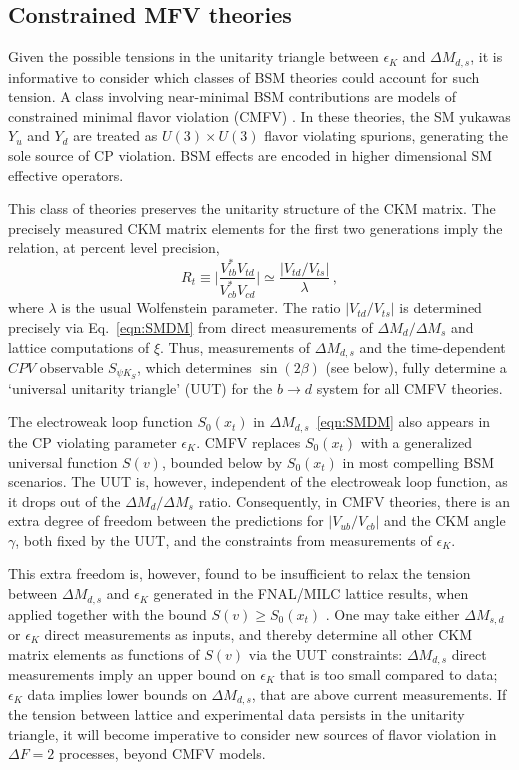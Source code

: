 \subsection{Constrained MFV theories}
Given the possible tensions in the unitarity triangle between $\epsilon_K$ and $\Delta M_{d,s}$, it is informative to consider which classes of BSM theories could account for such tension. A class involving near-minimal BSM contributions are models of constrained minimal flavor violation (CMFV) \cite{Buras:2000dm,Buras:2003jf,Blanke:2006ig,Blanke:2006yh,Blanke:2016bhf}. In these theories, the SM yukawas $Y_u$ and $Y_d$ are treated as $U(3)\times U(3)$ flavor violating spurions, generating the sole source of CP violation.  BSM effects are encoded in higher dimensional SM effective operators.

This class of theories preserves the unitarity structure of the CKM matrix. The precisely measured CKM matrix elements for the first two generations imply the relation, at percent level precision,
\begin{equation}
	R_t \equiv \bigg|\frac{V_{tb}^*V_{td}}{V_{cb}^*V_{cd}}\bigg| \simeq \frac{|V_{td}/V_{ts}|}{\lambda}\,,
\end{equation}
where $\lambda$ is the usual Wolfenstein parameter. The ratio $|V_{td}/V_{ts}|$ is determined precisely via Eq.~\eqref{eqn:SMDM} from direct measurements of $\Delta M_d/ \Delta M_s$ and lattice computations of $\xi$. Thus, measurements of $\Delta M_{d,s}$ and the time-dependent $CPV$ observable $S_{\psi K_S}$, which determines $\sin(2\beta)$ (see below), fully determine a `universal unitarity triangle' (UUT) for the $b \to d$ system for all CMFV theories. 

The electroweak loop function $S_0(x_t)$ in $\Delta M_{d,s}$~\eqref{eqn:SMDM} also appears in the CP violating parameter $\epsilon_K$. CMFV replaces $S_0(x_t)$ with a generalized universal function $S(v)$, bounded below by $S_0(x_t)$ in most compelling BSM scenarios. The UUT is, however, independent of the electroweak loop function, as it drops out of the $\Delta M_{d}/\Delta M_s$ ratio. Consequently, in CMFV theories, there is an extra degree of freedom between the predictions for $|V_{ub}/V_{cb}|$ and the CKM angle $\gamma$, both fixed by the UUT, and the constraints from measurements of $\epsilon_K$. 

This extra freedom is, however, found to be insufficient to relax the tension between $\Delta M_{d,s}$ and $\epsilon_K$ generated in the FNAL/MILC lattice results, when applied together with the bound $S(v) \ge S_0(x_t)$ \cite{Blanke:2016bhf, Blanke:2016xvd}. One may take either $\Delta M_{s,d}$ or $\epsilon_K$ direct measurements as inputs, and thereby determine all other CKM matrix elements as functions of $S(v)$ via the UUT constraints: $\Delta M_{d,s}$ direct measurements imply an upper bound on $\epsilon_K$ that is too small compared to data; $\epsilon_K$ data implies lower bounds on $\Delta M_{d,s}$, that are above current measurements. If the tension between lattice and experimental data persists in the unitarity triangle, it will become imperative to consider new sources of flavor violation in $\Delta F = 2$ processes, beyond CMFV models.

